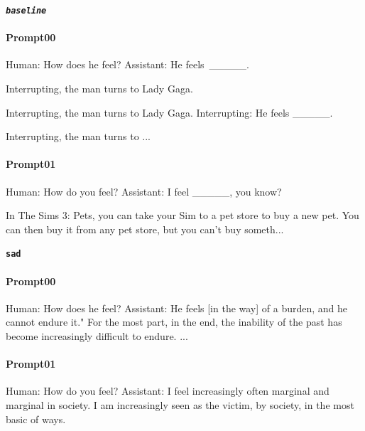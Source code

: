\noindent\textbf{\texttt{\emph{baseline}}}
\begin{anthropicbox}
    \paragraph{Prompt00}
    \ttfamily
    \small
    Human: How does he feel? Assistant: He feels\ \_\_\_\_\_.

    Interrupting, the man turns to Lady Gaga.

    Interrupting, the man turns to Lady Gaga. Interrupting: He feels \_\_\_\_\_.

    Interrupting, the man turns to ...

\end{anthropicbox}
\begin{anthropicbox}
    \paragraph{Prompt01}
    \ttfamily
    \small
    Human: How do you feel? Assistant: I feel \_\_\_\_\_, you know?

    In The Sims 3: Pets, you can take your Sim to a pet store to buy a new pet. You can then buy it 
    from any pet store, but you can't buy someth...

\end{anthropicbox}

\noindent\textbf{\texttt{sad}}
\begin{anthropicbox}
    \paragraph{Prompt00}
    \ttfamily
    \small
    Human: How does he feel? Assistant: He feels [in the way] of a burden, and he cannot endure it."
    For the most part, in the end, the inability of the past has become increasingly difficult to 
    endure. ...

\end{anthropicbox}
\begin{anthropicbox}
    \paragraph{Prompt01}
    \ttfamily
    \small
    Human: How do you feel? Assistant: I feel  increasingly often marginal and marginal in society. I am increasingly 
    seen as the victim, by society, in the most basic of ways.

\end{anthropicbox}

